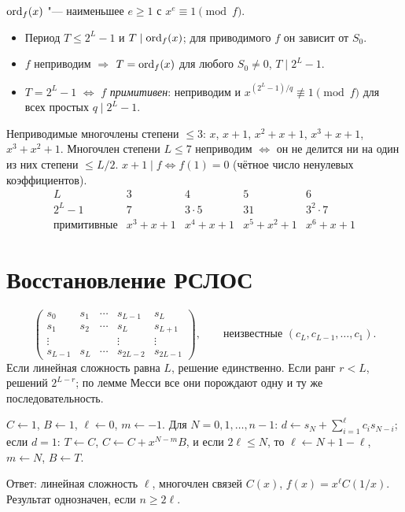 \documentclass{ca-handout}
\begin{document}
\begin{reminder}[title={Период ($c_L = 1$, $S_0 \ne 0$)}]
$\operatorname{ord}_f(x)$ "--- наименьшее $e \ge 1$ с $x^e \equiv 1 \pmod f$.
\begin{itemize}
  \item Период $T \le 2^L - 1$ и $T \mid \operatorname{ord}_f(x)$; для приводимого $f$ он зависит от $S_0$.
  \item $f$ неприводим $\Rightarrow$ $T = \operatorname{ord}_f(x)$ для любого $S_0 \ne 0$, $T \mid 2^L - 1$.
  \item $T = 2^L - 1$ $\iff$ $f$ \emph{примитивен}: неприводим и
    $x^{(2^L - 1)/q} \not\equiv 1 \pmod f$ для всех простых $q \mid 2^L - 1$.
\end{itemize}
\end{reminder}

Неприводимые многочлены степени $\le 3$: $x$, $x + 1$, $x^2 + x + 1$, $x^3 + x + 1$,
$x^3 + x^2 + 1$. Многочлен степени $L \le 7$ неприводим $\iff$ он не делится ни на один из
них степени $\le L/2$.
$x + 1 \mid f \iff f(1) = 0$ (чётное число ненулевых коэффициентов).
\[
\begin{array}{c|cccc}
  L & 3 & 4 & 5 & 6\\ \hline
  2^L - 1 & 7 & 3 \cdot 5 & 31 & 3^2 \cdot 7\\
  \text{примитивные} & x^3 + x + 1 & x^4 + x + 1 & x^5 + x^2 + 1 & x^6 + x + 1
\end{array}
\]

\section{Восстановление РСЛОС}
\begin{reminder}[title={Метод Гаусса по $2L$ битам}]
\[
  \left(\begin{array}{cccc|c}
    s_0 & s_1 & \cdots & s_{L-1} & s_L\\
    s_1 & s_2 & \cdots & s_L & s_{L+1}\\
    \vdots & & & \vdots & \vdots\\
    s_{L-1} & s_L & \cdots & s_{2L-2} & s_{2L-1}
  \end{array}\right),
  \qquad\text{неизвестные } (c_L, c_{L-1}, \dots, c_1).
\]
Если линейная сложность равна $L$, решение единственно. Если ранг $r < L$, решений $2^{L - r}$;
по лемме Месси все они порождают одну и ту же последовательность.
\end{reminder}

\begin{reminder}[title={Алгоритм Берлекэмпа"--~Месси}]
$C \gets 1$, $B \gets 1$, $\ell \gets 0$, $m \gets -1$. Для $N = 0, 1, \dots, n - 1$:
$d \gets s_N + \sum_{i=1}^{\ell} c_i s_{N-i}$; если $d = 1$: $T \gets C$, $C \gets C + x^{N-m} B$,
и если $2\ell \le N$, то $\ell \gets N + 1 - \ell$, $m \gets N$, $B \gets T$.
\par Ответ: линейная сложность $\ell$, многочлен связей $C(x)$, $f(x) = x^\ell C(1/x)$.
Результат однозначен, если $n \ge 2\ell$.
\end{reminder}
\end{document}
